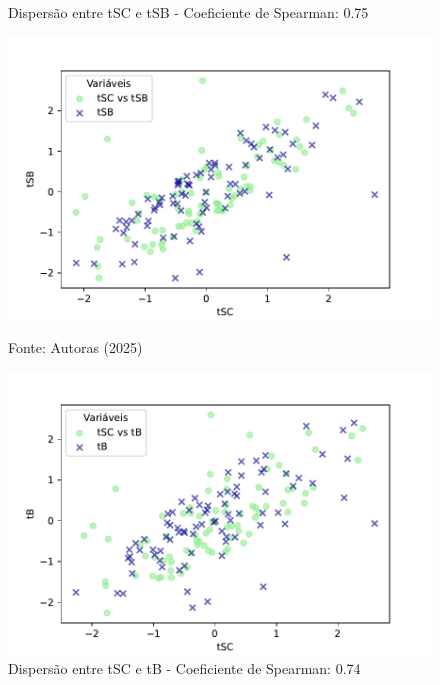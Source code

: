 \begin{figure}[h]
    \captionsetup{font=footnotesize, justification=centering, labelsep=period, position=above}
    \centering
    \begin{minipage}[b]{0.45\linewidth}
        \caption{Dispersão entre tSC e tSB - Coeficiente de Spearman: 0.75}
        \label{fig:tSC-tSB}
        \centering
        \includegraphics[scale=0.35]{figuras/Spearman/tSC-tSB.pdf}
        \vspace{0.3cm}
        \begin{minipage}{\linewidth}
            \centering
            \scriptsize{Fonte: Autoras (2025)}
        \end{minipage}
    \end{minipage}
    \hspace{0.05\linewidth}
    \begin{minipage}[b]{0.45\linewidth}
        \caption{Dispersão entre tSC e tB - Coeficiente de Spearman: 0.74}
        \label{fig:tSC-tB}
        \centering
        \includegraphics[scale=0.35]{figuras/Spearman/tSC-tB.pdf}

\end{minipage}
\end{figure}
